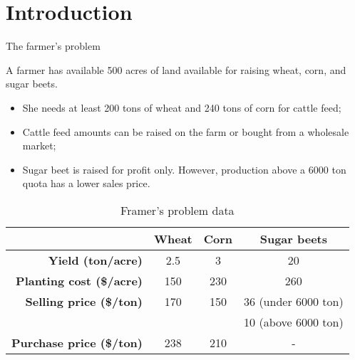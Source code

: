 \section{Introduction}

\begin{frame}{The farmer's problem {\small \cite{birge2011introduction}}}
	
	A farmer has available \alert{500 acres} of land available for raising wheat, corn, and sugar beets. 
	\begin{itemize}
		\item She needs at least \alert{200 tons of wheat} and \alert{240 tons of corn} for cattle feed;
		\item Cattle feed amounts can be \alert{raised} on the farm or \alert{bought} from a wholesale market;
		\item Sugar beet is raised for profit only. However, production above a \alert{6000 ton quota} has a lower sales price. 
	\end{itemize}	
	\pause
	\vspace{-6pt}
	{\small
	\begin{table}
		\begin{tabular}{r|ccc}
			& \bf Wheat & \bf Corn & \bf Sugar beets \\ \hline
			\bf Yield (ton/acre) & 2.5 & 3 & 20 \\
			\bf Planting cost (\$/acre) & 150 & 230 & 260 \\
			\bf Selling price (\$/ton) & 170 & 150  & 36 (under 6000 ton) \\
								   & 	 &	    & 10 (above 6000 ton) \\
			\bf Purchase price (\$/ton)& 238 & 210  & - \\ \hline					    
		\end{tabular}
		\caption{Framer's problem data}		
	\end{table}
	}
	
\end{frame}


